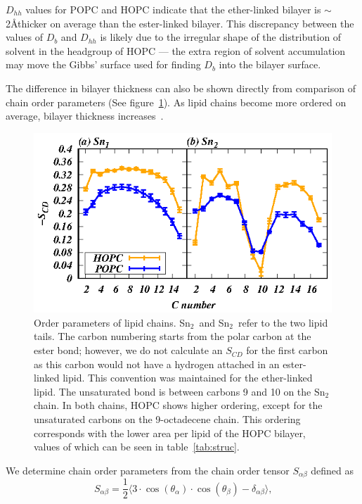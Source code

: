 \documentclass[12pt,openany,final]{book}
\newcommand{\about}{$\sim$}
\begin{document}
$D_{hh}$ values for POPC and HOPC indicate that the ether-linked bilayer is \about2\AA thicker on average than the ester-linked bilayer. 
This discrepancy between the values of $D_b$ and $D_{hh}$ is likely due to the irregular shape of the 
distribution of solvent in the headgroup of HOPC --- the extra region 
of solvent accumulation may move the Gibbs' surface used for finding $D_b$ into the bilayer surface.

The difference in bilayer thickness can also be shown directly from comparison of chain order 
parameters (See figure~\ref{fig:chainorder}). As lipid chains become more ordered on average, bilayer thickness
increases~\cite{nagle:2000}.

\begin{figure}[p]
    \caption[Order parameters of lipid chains.]{ 
Order parameters of lipid chains. Sn$_2$~and Sn$_2$~refer to the two lipid tails. 
The carbon numbering starts from the polar carbon
at the ester bond; however, we do not calculate an $S_{CD}$ for the first carbon as this carbon would not have 
a hydrogen attached in an ester-linked lipid. 
This convention was maintained for the ether-linked lipid. The 
unsaturated bond is between carbons 9 and 10 on the $\text{Sn}_2$ chain.
In both chains, HOPC shows higher ordering, except for the unsaturated carbons on  the 
9-octadecene chain. This ordering corresponds with the lower area per lipid 
of the HOPC bilayer, values of which can be seen in table~\ref{tab:struc}. }
\label{fig:chainorder}
\includegraphics[width=\textwidth]{chainorder.eps}
\end{figure}
We determine chain order parameters from the chain order tensor $S_{\alpha\beta}$ defined as
\begin{equation}
\label{eq:chainorder}
S_{\alpha\beta}=\frac{1}{2}\bigg \langle 3 \cdot \cos(\theta_\alpha) \cdot \cos(\theta_\beta) - \delta_{\alpha\beta}\bigg \rangle\text{,}
\end{equation}
\end{document}
